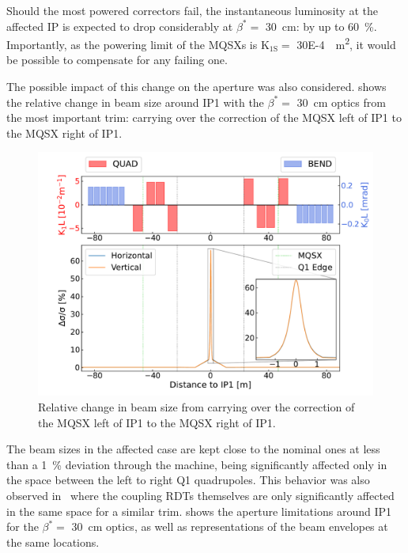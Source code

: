 Should the most powered correctors fail, the instantaneous luminosity at the affected IP is expected to drop considerably at \(\beta^{\ast} =\) \qty{30}{\centi\meter}: by up to \qty{60}{\percent}.
Importantly, as the powering limit of the MQSXs is \(\mathrm{K_{1S}} =\) \qty{30E-4}{\per\square\meter}, it would be possible to compensate for any failing one.

The possible impact of this change on the aperture was also considered.
 shows the relative change in beam size around IP\num{1} with the \(\beta^{\ast} =\) \qty{30}{\centi\meter} optics from the most important trim: carrying over the correction of the MQSX left of IP\num{1} to the MQSX right of IP\num{1}.

\begin{figure}[!htb]
    \centering
    \includegraphics*[width=\textwidth]{Figures/IR_Coupling_Correction/carry_over_to_ir1_right_beam_size_impact.pdf}
    \caption{Relative change in beam size from carrying over the correction of the MQSX left of IP\num{1} to the MQSX right of IP\num{1}.}
    \label{figure:carry_over_impact_on_beam_size}
\end{figure}

The beam sizes in the affected case are kept close to the nominal ones at less than a \qty{1}{\percent} deviation through the machine, being significantly affected only in the space between the left to right Q\num{1} quadrupoles.
This behavior was also observed in~\cite{PRAB:Hofer:Coupling_Local_Observables} where the coupling RDTs themselves are only significantly affected in the same space for a similar trim.
 shows the aperture limitations around IP\num{1} for the \(\beta^{\ast} =\) \qty{30}{\centi\meter} optics, as well as representations of the beam envelopes at the same locations.

